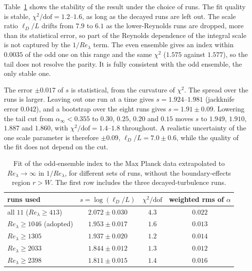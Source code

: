 \documentclass[floatfix,aps,pre,preprint,superscriptaddress,nofootinbib,amsmath,amssymb]{revtex4-2}
\begin{document}
Table~\ref{tab:extrap} shows the stability of the result under the choice of runs. The fit quality is stable,
$\chi^2/\mathrm{dof}=1.2$--$1.6$, as long as the decayed runs are left out. The scale ratio
$\ell_D/L$ drifts from $7.9$ to $6.1$ as the lower-Reynolds runs are dropped, more than its statistical error, so part of the
Reynolds dependence of the integral scale is not captured by the $1/Re_\lambda$ term. The even ensemble gives an index within
$0.0035$ of the odd one on this range and the same $\chi^2$ ($1.575$ against $1.577$), so the tail does not resolve the parity.
It is fully consistent with the odd ensemble, the only stable one.

The error $\pm0.017$ of $s$ is statistical, from the curvature of $\chi^2$. The spread over the runs is larger. Leaving
out one run at a time gives $s=1.924$--$1.981$ (jackknife error $0.042$), and a bootstrap over the eight runs gives
$s=1.91\pm0.09$. Lowering the tail cut from $\alpha_\infty<0.355$ to $0.30$, $0.25$, $0.20$ and $0.15$ moves $s$ to $1.949$,
$1.910$, $1.887$ and $1.860$, with $\chi^2/\mathrm{dof}=1.4$--$1.8$ throughout. A realistic uncertainty of the one scale
parameter is therefore $\pm0.09$, $\ell_D/L=7.0\pm0.6$, while the quality of the fit does not depend on the cut.

\begin{table}[tbp]
    \centering
    \begin{tabular}{lccc}
    \toprule
    runs used & $s=\log(\ell_D/L)$ & $\chi^2/\mathrm{dof}$ & weighted rms of $\alpha$\\
    \midrule
    all $11$ ($Re_\lambda\ge413$) & $2.072\pm0.030$ & $4.3$ & $0.022$\\
    $Re_\lambda\ge1046$ (adopted) & $1.953\pm0.017$ & $1.6$ & $0.013$\\
    $Re_\lambda\ge1305$ & $1.937\pm0.020$ & $1.2$ & $0.014$\\
    $Re_\lambda\ge2033$ & $1.844\pm0.012$ & $1.3$ & $0.012$\\
    $Re_\lambda\ge2398$ & $1.811\pm0.015$ & $1.4$ & $0.016$\\
    \bottomrule
    \end{tabular}
    \caption{Fit of the odd-ensemble index to the Max Planck data extrapolated to $Re_\lambda\to\infty$ in $1/Re_\lambda$, for
    different sets of runs, without the boundary-effects region $r>W$. The first row includes the three decayed-turbulence runs.}
    \label{tab:extrap}
\end{table}
\end{document}
